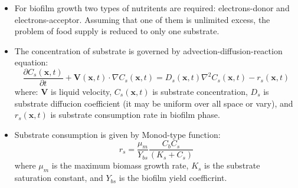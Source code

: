 \documentclass[10pt,a4paper]{article}
\begin{document}
\begin{itemize}
 \item For biofilm growth two types of nutritents are required: electrons-donor and electrons-acceptor.
 Assuming that one of them is unlimited excess, the problem of food supply is reduced to only one substrate.
 \item The concentration of substrate is governed by advection-diffusion-reaction equation:
 \begin{equation}
  \frac{\partial C_s(\mathbf{x},t)}{\partial t} + \mathbf{V}(\mathbf{x},t) \cdot \nabla C_s(\mathbf{x},t) = D_s(\mathbf{x},t) \nabla^2 C_s(\mathbf{x},t) -r_s(\mathbf{x},t)
 \end{equation}
 where: $\mathbf{V}$ is liquid velocity, $C_s(\mathbf{x},t)$ is substrate concentration, $D_s$ is substrate diffucion coefficient (it may be uniform over all space or vary),
 and $r_s(\mathbf{x},t)$ is substrate consumption rate in biofilm phase. 

 \item Substrate consumption is given by Monod-type function:
 \begin{equation}
  r_s = \frac{\mu_m}{Y_{bs}} \frac{C_bC_s}{(K_s + C_s)}
 \end{equation}
 where $\mu_m$ is the maximum biomass growth rate, $K_s$ is the substrate saturation constant, and $Y_{bs}$ is the biofilm yield coefficrint. 


\end{itemize}
\end{document}

